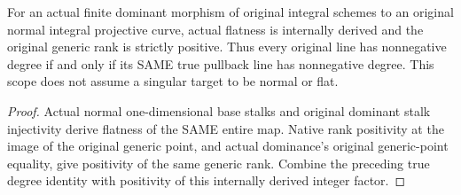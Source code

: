 \begin{theorem}
\label{thm:fc-curve-normal-finite-line-degree}
\leanok
{}
For an actual finite dominant morphism of original integral schemes
to an original normal integral projective curve, actual flatness is
internally derived and the original generic rank is strictly
positive. Thus every original line has nonnegative degree if and
only if its SAME true pullback line has nonnegative degree.
This scope does not assume a singular target to be normal or flat.
\end{theorem}
\begin{proof}
Actual normal one-dimensional base stalks and original dominant
stalk injectivity derive flatness of the SAME entire map. Native
rank positivity at the image of the original generic point, and
actual dominance's original generic-point equality, give positivity
of the same generic rank. Combine the preceding true degree
identity with positivity of this internally derived integer factor.
\end{proof}
